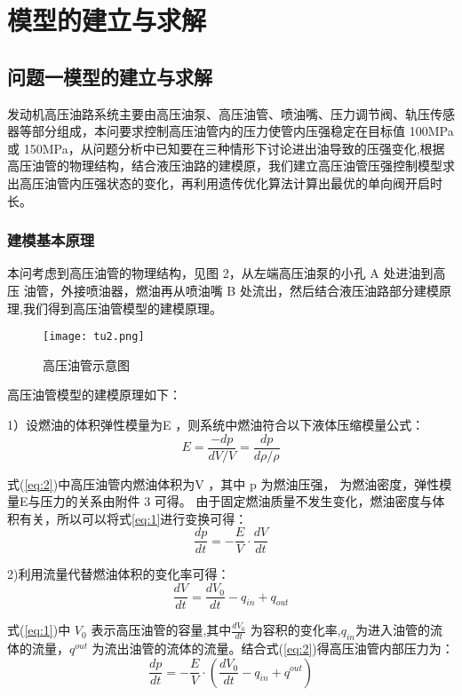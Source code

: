 \documentclass{cumcmthesis}
\begin{document}
\section{模型的建立与求解}
\subsection{问题一模型的建立与求解}
发动机高压油路系统主要由高压油泵、高压油管、喷油嘴、压力调节阀、轨压传感器等部分组成\textsuperscript{\cite{bib:two}}，本问要求控制高压油管内的压力使管内压强稳定在目标值 100MPa 或 150MPa，从问题分析中已知要在三种情形下讨论进出油导致的压强变化,根据高压油管的物理结构，结合液压油路的建模原，我们建立高压油管压强控制模型求出高压油管内压强状态的变化，再利用遗传优化算法计算出最优的单向阀开启时长。

\subsubsection{建模基本原理}
本问考虑到高压油管的物理结构，见图 2，从左端高压油泵的小孔 A 处进油到高压 油管，外接喷油器，燃油再从喷油嘴 B 处流出，然后结合液压油路部分建模原理\textsuperscript{\cite{bib:three}},我们得到高压油管模型的建模原理。
\begin{figure}[htb] \centering 
	
	\texttt{[image: tu2.png]} 
	
	\caption{高压油管示意图 } \label{fig:2} \end{figure} 

高压油管模型的建模原理如下：

1）设燃油的体积弹性模量为E ，则系统中燃油符合以下液体压缩模量公式：
\begin{equation}
E=\frac{-dp}{dV/V}=\frac{dp}{d\rho/\rho}\label{eq:1}
\end{equation} 

式(\ref{eq:2})中高压油管内燃油体积为V ，其中 p 为燃油压强， 为燃油密度，弹性模 量E与压力的关系由附件 3 可得。 由于固定燃油质量不发生变化，燃油密度与体积有关，所以可以将式\ref{eq:1}进行变换可得： 
\begin{equation}
\frac{dp}{dt}=-\frac{E}{V}\cdot\frac{dV}{dt}\label{eq:2}
\end{equation} 

2)利用流量代替燃油体积的变化率\textsuperscript{\cite{bib:four}}可得： 
\begin{equation}
\frac{dV}{dt}=\frac{dV_{0}}{dt}-q_{in}+q_{out}\label{eq:3}
\end{equation}


式(\ref{eq:1})中 $V_{0}$ 表示高压油管的容量,其中$\frac{dV_{0}}{dt}$
为容积的变化率,$q_{in}$为进入油管的流体的流量，$q^{out}$ 为流出油管的流体的流量。结合式(\ref{eq:2})得高压油管内部压力为： 
\begin{equation}
\frac{dp}{dt}=-\frac{E}{V}\cdot\left(\frac{dV_{0}}{dt}-q_{in}+q^{out}\right)\label{eq:4}
\end{equation}
\end{document}
